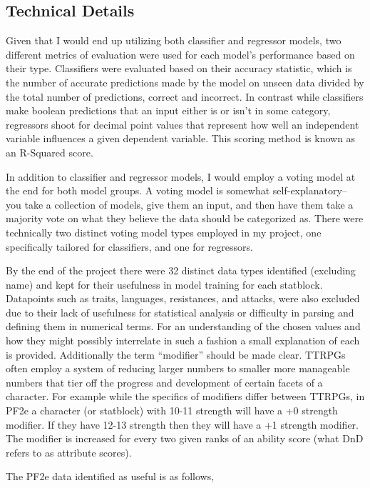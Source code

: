 \documentclass[11pt]{article}
\begin{document}
\subsection{Technical Details}

Given that I would end up utilizing both classifier and regressor models, two different metrics of evaluation were used for each model's performance based on their type. Classifiers were evaluated based on their accuracy statistic, which is the number of accurate predictions made by the model on unseen data divided by the total number of predictions, correct and incorrect. In contrast while classifiers make boolean predictions that an input either is or isn't in some category, regressors shoot for decimal point values that represent how well an independent variable influences a given dependent variable. This scoring method is known as an R-Squared score.

In addition to classifier and regressor models, I would employ a voting model at the end for both model groups. A voting model is somewhat self-explanatory-- you take a collection of models, give them an input, and then have them take a majority vote on what they believe the data should be categorized as. There were technically two distinct voting model types employed in my project, one specifically tailored for classifiers, and one for regressors.

By the end of the project there were 32 distinct data types identified (excluding name) and kept for their usefulness in model training for each statblock. Datapoints such as traits, languages, resistances, and attacks, were also excluded due to their lack of usefulness for statistical analysis or difficulty in parsing and defining them in numerical terms. For an understanding of the chosen values and how they might possibly interrelate in such a fashion a small explanation of each is provided. Additionally the term ``modifier'' should be made clear. TTRPGs often employ a system of reducing larger numbers to smaller more manageable numbers that tier off the progress and development of certain facets of a character. For example while the specifics of modifiers differ between TTRPGs, in PF2e a character (or statblock) with 10-11 strength will have a +0 strength modifier. If they have 12-13 strength then they will have a +1 strength modifier. The modifier is increased for every two given ranks of an ability score (what DnD refers to as attribute scores).

The PF2e data identified as useful is as follows,
\end{document}
